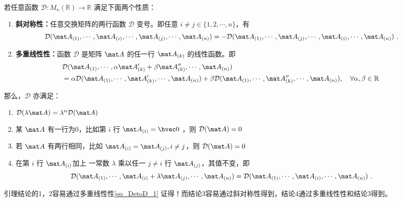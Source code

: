 \begin{lemma}{}\label{lem_DetoD_1}
若任意函数 $\mathcal D:M_n(\mathbb R)\rightarrow \mathbb R$ 满足下面两个性质：
\begin{enumerate}
\item \textbf{斜对称性：}任意交换矩阵的两行函数 $\mathcal D$ 变号。即任意 $i\neq j\in \{1,2,\cdots,n\}$，有
\begin{equation}
\mathcal D(\mat A_{(1)},\cdots,\mat A_{(i)},\cdots,\mat A_{(j)},\cdots,\mat A_{(n)})=-\mathcal D(\mat A_{(1)},\cdots,\mat A_{(j)},\cdots,\mat A_{(i)},\cdots,\mat A_{(n)})~.
\end{equation}
\item \textbf{多重线性性：}函数 $\mathcal D$ 是矩阵 $\mat A$ 的任一行 $\mat A_{(k)}$ 的线性函数。即
\begin{equation}\label{eq_DetoD_1}
\begin{aligned}
&\mathcal D(\mat A_{(1)},\cdots,\alpha \mat A'_{(k)}+\beta\mat A''_{(k)},\cdots,\mat A_{(n)})\\
&=\alpha\mathcal D(\mat A_{(1)},\cdots,\mat A'_{(k)},\cdots,\mat A_{(n)})+\beta\mathcal D(\mat A_{(1)},\cdots,\mat A''_{(k)},\cdots,\mat A_{(n)}),\quad\forall\alpha,\beta\in\mathbb R
\end{aligned}~
\end{equation}
\end{enumerate}
那么，$\mathcal D$ 亦满足：
\begin{enumerate}
\item $\mathcal D(\lambda\mat A)=\lambda^n\mathcal D(\mat A)$
\item 某 $\mat A$ 有一行为0，比如第 $i$ 行 $\mat A_{(i)}=\bvec 0$ ，则 $\mathcal D(\mat A)=0$
\item 若 $\mat A$ 有两行相同，比如 $\mat A_{(i)}=\mat A_{(j)},i\neq j$，则 $\mathcal D(\mat A)=0$
\item 在第 $i$ 行 $\mat A_{(i)}$加上 一常数 $\lambda$ 乘以任一 $j\neq i$ 行 $\mat A_{(j)}$，其值不变，即
\begin{equation}
\mathcal D(\mat A_{(1)},\cdots,\mat A_{(i)}+\lambda \mat A_{(j)},\cdots,\mat A_{(n)})=\mathcal D(\mat A_{(1)},\cdots,\mat A_{(i)},\cdots,\mat A_{(n)})~.
\end{equation}
\end{enumerate}
\end{lemma}
引理结论的1，2容易通过多重线性性\autoref{eq_DetoD_1} 证得！而结论3容易通过斜对称性得到，结论4通过多重线性性和结论3得到。

